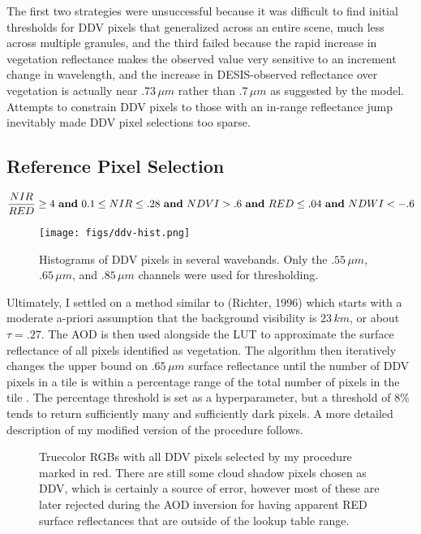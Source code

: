 \documentclass[12pt]{article}
\begin{document}
The first two strategies were unsuccessful because it was difficult to find initial thresholds for DDV pixels that generalized across an entire scene, much less across multiple granules, and the third failed because the rapid increase in vegetation reflectance makes the observed value very sensitive to an increment change in wavelength, and the increase in DESIS-observed reflectance over vegetation is actually near $.73\,\si{\mu m}$ rather than $.7\,\si{\mu m}$ as suggested by the model. Attempts to constrain DDV pixels to those with an in-range reflectance jump inevitably made DDV pixel selections too sparse.

\subsection{Reference Pixel Selection}

\begin{equation}\label{ddv_thresh}
    \frac{NIR}{RED} \geq 4 \text{ \textbf{and} } 0.1 \leq NIR \leq .28 \text{ \textbf{and} } NDVI > .6 \text{ \textbf{and} } RED \leq .04 \text{ \textbf{and} } NDWI < -.6
\end{equation}

\begin{figure}[h!]
    \centering
    \begin{center}
        \texttt{[image: figs/ddv-hist.png]}
    \end{center}
    \caption{Histograms of DDV pixels in several wavebands. Only the $.55\,\si{\mu m}$, $.65\,\si{\mu m}$, and $.85\,\si{\mu m}$ channels were used for thresholding.}
    \label{ddv-hist}
\end{figure}

Ultimately, I settled on a method similar to (Richter, 1996) which starts with a moderate a-priori assumption that the background visibility is $23\,\si{km}$, or about $\tau = .27$. The AOD is then used alongside the LUT to approximate the surface reflectance of all pixels identified as vegetation. The algorithm then iteratively changes the upper bound on $.65\,\si{\mu m}$ surface reflectance until the number of DDV pixels in a tile is within a percentage range of the total number of pixels in the tile \cite{richter_spatially_1996}. The percentage threshold is set as a hyperparameter, but a threshold of $8\%$ tends to return sufficiently many and sufficiently dark pixels. A more detailed description of my modified version of the procedure follows.

\begin{figure}[h!]
    \centering
    \begin{center}
    \end{center}
    \caption{Truecolor RGBs with all DDV pixels selected by my procedure marked in red. There are still some cloud shadow pixels chosen as DDV, which is certainly a source of error, however most of these are later rejected during the AOD inversion for having apparent RED surface reflectances that are outside of the lookup table range.}
    \label{ddv_sel}
\end{figure}
\end{document}
